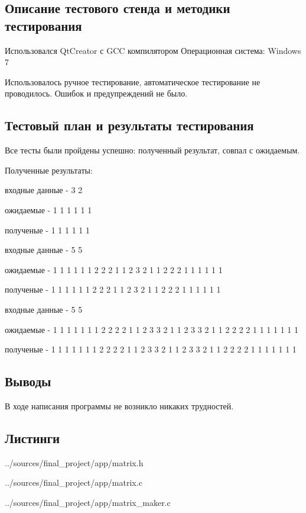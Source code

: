 \documentclass[12pt,a4paper]{report}
\begin{document}
\subsection{Описание тестового стенда и методики тестирования}
Использовался QtCreator с GCC компилятором
Операционная система: Windows 7


Использовалось ручное тестирование, автоматическое тестирование не проводилось.
Ошибок и предупреждений не было.

\subsection{Тестовый план и результаты тестирования}
Все тесты были пройдены успешно: полученный результат, совпал с ожидаемым.

Полученные результаты:
\item входные данные - 3 2

ожидаемые - 1 1 1
            1 1 1
            
полученые - 1 1 1
            1 1 1

\item входные данные - 5 5

ожидаемые - 1 1 1 1 1
            1 2 2 2 1
            1 2 3 2 1
            1 2 2 2 1
            1 1 1 1 1
            
полученые - 1 1 1 1 1
            1 2 2 2 1
            1 2 3 2 1
            1 2 2 2 1
            1 1 1 1 1
 
\item входные данные - 5 5

ожидаемые - 1 1 1 1 1 1
            1 2 2 2 2 1
            1 2 3 3 2 1
            1 2 3 3 2 1
            1 2 2 2 2 1
            1 1 1 1 1 1
            
полученые - 1 1 1 1 1 1
            1 2 2 2 2 1
            1 2 3 3 2 1
            1 2 3 3 2 1
            1 2 2 2 2 1
            1 1 1 1 1 1
            
\subsection{Выводы}

В ходе написания программы не возникло никаких трудностей.

\subsection*{Листинги}

{../sources/final_project/app/matrix.h}

{../sources/final_project/app/matrix.c}

{../sources/final_project/app/matrix_maker.c}
\end{document}
